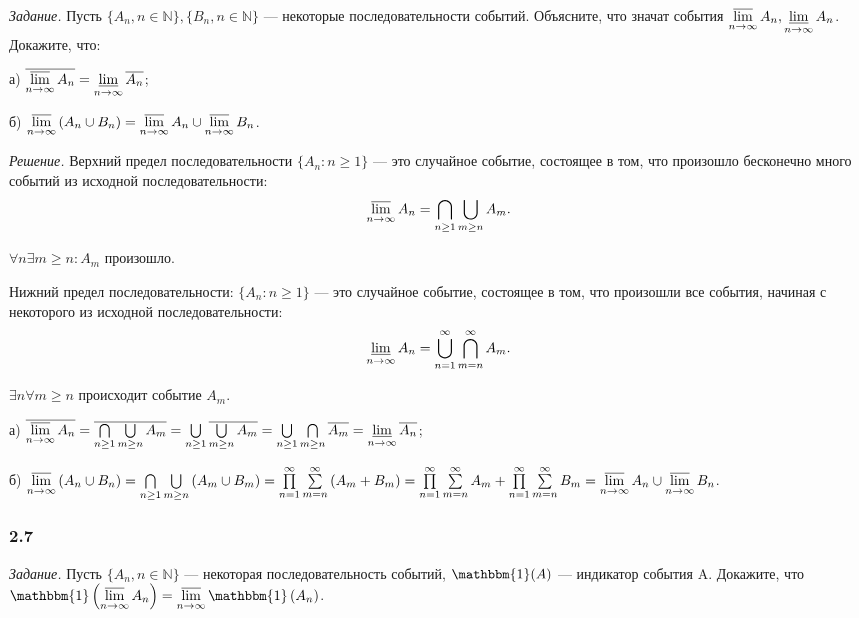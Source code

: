 \documentclass{book}
\begin{document}
\textit{Задание.} Пусть $\{A_n, n\in\mathbb{N}\}, \{B_n, n\in\mathbb{N}\}$ --- некоторые последовательности событий. Объясните, что значат события $\varlimsup\limits_{n\to\infty}A_n, \varliminf\limits_{n\to\infty}A_n$. Докажите, что:

а) $\overline{\varlimsup\limits_{n\to\infty}A_n}=\varliminf\limits_{n\to\infty}\overline{A_n}$;

б) $\varlimsup\limits_{n\to\infty}\left(A_n\cup B_n\right)=\varlimsup\limits_{n\to\infty}A_n\cup\varlimsup\limits_{n\to\infty}B_n$.

\textit{Решение.} Верхний предел последовательности $\{A_n: n\geq 1\}$ --- это случайное событие, состоящее в том, что произошло бесконечно много событий из исходной последовательности: $$\varlimsup\limits_{n\to\infty}A_n=\bigcap\limits_{n\geq 1}\bigcup\limits_{m\geq n}A_m.$$

$\forall n \exists m\geq n: A_m$ произошло.

Нижний предел последовательности: $\{A_n: n\geq 1\}$ --- это случайное событие, состоящее в том, что произошли все события, начиная с некоторого из исходной последовательности: $$\varliminf\limits_{n\to\infty}A_n=\bigcup\limits_{n=1}^\infty\bigcap\limits_{m=n}^\infty A_m.$$

$\exists n \forall m\geq n$ происходит событие $A_m$.

а) $\overline{\varlimsup\limits_{n\to\infty}A_n}=\overline{\bigcap\limits_{n\geq 1}\bigcup\limits_{m\geq n}A_m}=\bigcup\limits_{n\geq 1}\overline{\bigcup\limits_{m\geq n}A_m}=\bigcup\limits_{n\geq 1}\bigcap\limits_{m\geq n}\overline{A_m}=\varliminf\limits_{n\to\infty}\overline{A_n}$;

б) $\varlimsup\limits_{n\to\infty}\left(A_n\cup B_n\right)=\bigcap\limits_{n\geq 1}\bigcup\limits_{m\geq n}\left(A_m\cup B_m\right)=\prod\limits_{n=1}^\infty\sum\limits_{m=n}^\infty\left(A_m+B_m\right)=\prod\limits_{n=1}^\infty\sum\limits_{m=n}^\infty A_m+\prod\limits_{n=1}^\infty\sum\limits_{m=n}^\infty B_m=\varlimsup\limits_{n\to\infty}A_n\cup\varlimsup\limits_{n\to\infty}B_n$.

\subsubsection*{2.7}

\textit{Задание.} Пусть $\{A_n, n\in\mathbb{N}\}$ --- некоторая последовательность событий, $\mathbbm{1}(A)$ --- индикатор события A. Докажите, что $\mathbbm{1}\left(\varlimsup\limits_{n\to\infty}A_n\right)=\varlimsup\limits_{n\to\infty}\mathbbm{1}\left(A_n\right)$.
\end{document}
